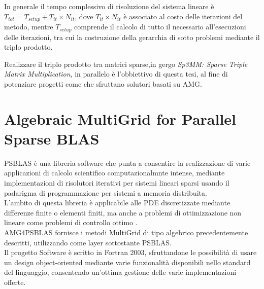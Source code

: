 In generale il tempo complessivo di risoluzione del sistema lineare è $T_{tot} = T_{setup} + T_{it}\times N_{it}$,
dove $T_{it}\times N_{it}$ è associato al costo delle iterazioni del metodo, 
mentre $T_{setup}$ comprende il calcolo di tutto il necessario all'esecuzioni delle iterazioni,
tra cui la costruzione della gerarchia di sotto problemi mediante il triplo prodotto.\\ %
\par\null\par
Realizzare il triplo prodotto tra matrici sparse,in gergo \emph{Sp3MM: Sparse Triple Matrix Multiplication},  
in parallelo è l'obbiettivo di questa tesi, al fine di potenziare progetti come \cite{AMG4PSBLAS} che sfruttano solutori basati su AMG.\\
\section{Algebraic MultiGrid for Parallel Sparse BLAS} \label{amg4psblas}
PSBLAS è una libreria software che punta a consentire la realizzazione di varie applicazioni di calcolo scientifico computazionalmnte intense,
mediante implementazioni di risolutori iterativi per sistemi lineari sparsi 
usando il padarigma di programmazione per sistemi a memoria distribuita.\\
L'ambito di questa libreria è applicabile alle PDE discretizzate mediante differenze finite o elementi finiti,
ma anche a problemi di ottimizzazione non lineare come problemi di controllo ottimo \cite{PSBLAS3man}.\\
AMG4PSBLAS \cite{AMG4PSBLASman} fornisce i metodi MultiGrid di tipo algebrico precedentemente descritti,
utilizzando come layer sottostante PSBLAS.\\
Il progetto Software è scritto in Fortran 2003, sfruttandone le possibilità di 
usare un design object-oriented mediante varie funzionalità disponibili nello standard del linguaggio,
consentendo un'ottima gestione delle varie implementazioni offerte. 
